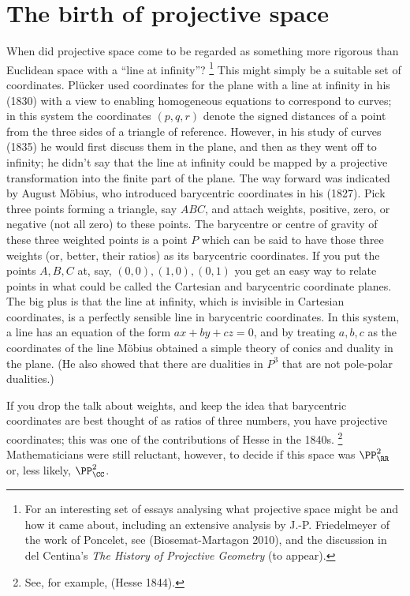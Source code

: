 \section{The birth of projective space}
When did projective space
%
come to be regarded as something more rigorous
than Euclidean space with a ``line at infinity''?%
%
\footnote{For an
interesting  set of essays analysing what projective space might be and
how it came about, including an extensive analysis by J.-P.
Friedelmeyer
%
of the work of Poncelet, see (Biosemat-Martagon 2010), and the discussion
%
in del Centina's \emph{The History of Projective Geometry} (to appear).}
%
 This might simply be a suitable set of coordinates. Pl\"ucker used
 coordinates for the plane with a line at infinity in his (1830) with
 a view to enabling homogeneous equations
%
to correspond to curves; in
 this system the coordinates $(p, q, r)$ denote the signed distances of
 a point from the three sides of a triangle of reference. However, in
 his study of curves (1835) he would first discuss them in  the plane,
 and then as they went off to infinity; he didn't say that the line at
 infinity could be mapped by a projective transformation into the finite
 part of the plane.  The way forward was indicated by August M\"obius,
%
 who introduced barycentric coordinates
%
in his (1827). Pick three points
 forming a triangle, say $ABC$, and attach weights, positive, zero, or
 negative (not all zero) to these points. The barycentre or centre of
 gravity of these three weighted points is a point $P$ which can be said
 to have those three weights (or, better, their ratios) as its barycentric
 coordinates. If you put the points $A, B, C$ at, say,  $(0, 0), (1, 0),
 (0, 1)$ you get an easy way to relate points in what could be called
 the Cartesian and barycentric coordinate planes. The big plus is that
 the line at infinity,
%
 which is invisible in Cartesian coordinates, is
 a perfectly sensible line in barycentric coordinates. In this system,
 a line has an equation of the form $ax+by+cz=0$, and by treating $a,
 b, c$ as the coordinates of the line M\"obius obtained a simple theory
 of conics and duality in the plane. (He also showed that there are
 dualities in $P^3$ that are not pole-polar dualities.)

If you drop the talk about weights, and keep the idea that barycentric
coordinates are best thought of as ratios of three numbers, you have
projective coordinates;
%
 this was one of the contributions of Hesse in
%
the 1840s.%
%
\footnote{See, for example, (Hesse 1844).}
%
Mathematicians were still reluctant, however, to decide if this space
%
was $\PP_{\RR}^2$ or, less likely, $\PP_{\CC}^2$.

